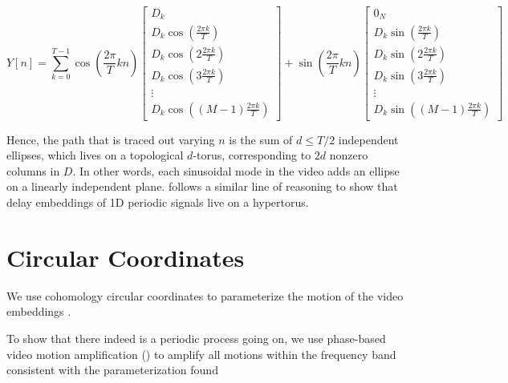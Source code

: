 \documentclass[a4paper,UKenglish]{lipics}
\begin{document}
\begin{equation}
Y[n] = \sum_{k = 0}^{T-1} \cos \left( \frac{2 \pi}{T} k n \right) \left[ \begin{array}{c} D_k \\ D_k \cos \left( \frac{2 \pi k}{T} \right) \\ D_k \cos \left( 2 \frac{2 \pi k}{T} \right) \\ D_k \cos \left( 3 \frac{2 \pi k}{T} \right) \\ \vdots \\ D_k \cos \left( (M-1) \frac{2 \pi k}{T} \right) \end{array} \right] + \sin \left( \frac{2 \pi}{T} k n \right) \left[ \begin{array}{c} 0_N \\ D_k \sin \left( \frac{2 \pi k}{T} \right) \\ D_k \sin \left( 2 \frac{2 \pi k}{T} \right) \\ D_k \sin \left( 3 \frac{2 \pi k}{T} \right) \\ \vdots \\ D_k \sin \left( (M-1) \frac{2 \pi k}{T} \right) \end{array} \right]
\end{equation}



Hence, the path that is traced out varying $n$ is the sum of $d \leq T/2$ independent ellipses, which lives on a topological $d$-torus, corresponding to $2d$ nonzero columns in $D$.  In other words, each sinusoidal mode in the video adds an ellipse on a linearly independent plane.  \cite{perea2013sliding} follows a similar line of reasoning to show that delay embeddings of 1D periodic signals live on a hypertorus.


\section{Circular Coordinates}


We use cohomology circular coordinates to parameterize the motion of the video embeddings \cite{de2011persistent}.

To show that there indeed is a periodic process going on, we use phase-based video motion amplification (\cite{wadhwa2013phase}) to amplify all motions within the frequency band consistent with the parameterization found 
\end{document}
